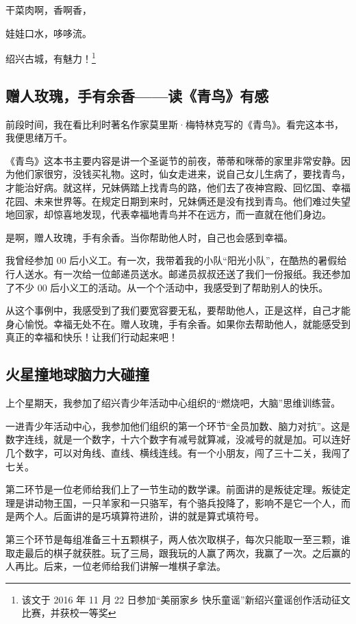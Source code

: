 \documentclass[UTF8,a4paper,titlepage,twoside,10.5pt]{article}
\begin{document}
干菜肉啊，香啊香，

娃娃口水，哆哆流。

绍兴古城，有魅力！\footnote{该文于 2016 年 11 月 22 日参加“美丽家乡  快乐童谣”新绍兴童谣创作活动征文比赛，并获校一等奖}

\subsection{赠人玫瑰，手有余香——读《青鸟》有感}
\label{sec:org54d6878}

前段时间，我在看比利时著名作家莫里斯·梅特林克写的《青鸟》。看完这本书，我便思绪万千。

《青鸟》这本书主要内容是讲一个圣诞节的前夜，蒂蒂和咪蒂的家里非常安静。因为他们家很穷，没钱买礼物。这时，仙女走进来，说自己女儿生病了，要找青鸟，才能治好病。就这样，兄妹俩踏上找青鸟的路，他们去了夜神宫殿、回忆国、幸福花园、未来世界等。在规定日期到来时，兄妹俩还是没有找到青鸟。他们难过失望地回家，却惊喜地发现，代表幸福地青鸟并不在远方，而一直就在他们身边。

是啊，赠人玫瑰，手有余香。当你帮助他人时，自己也会感到幸福。

我曾经参加 00 后小义工。有一次，我带着我的小队“阳光小队”，在酷热的暑假给行人送水。有一次给一位邮递员送水。邮递员叔叔还送了我们一份报纸。我还参加了不少 00 后小义工的活动。从一个个活动中，我感受到了帮助别人的快乐。

从这个事例中，我感受到了我们要宽容要无私，要帮助他人，正是这样，自己才能身心愉悦。幸福无处不在。赠人玫瑰，手有余香。如果你去帮助他人，就能感受到真正的幸福和快乐！让我们行动起来吧！

\subsection{火星撞地球脑力大碰撞}
\label{sec:org4ce64ae}

上个星期天，我参加了绍兴青少年活动中心组织的“燃烧吧，大脑”思维训练营。

一进青少年活动中心，我参加他们组织的第一个环节“全员加数、脑力对抗”。这是数字连线，就是一个数字，十六个数字有减号就算减，没减号的就是加。可以连好几个数字，可以对角线、直线、横线连线。有一个小朋友，闯了三十二关，我闯了七关。

第二环节是一位老师给我们上了一节生动的数学课。前面讲的是叛徒定理。叛徒定理是讲动物王国，一只羊家和一只骆军，有个骆兵投降了，影响不是它一个人，而是两个人。后面讲的是巧填算符进阶，讲的就是算式填符号。

第三个环节是每组准备三十五颗棋子，两人依次取棋子，每次只能取一至三颗，谁取走最后的棋子就获胜。玩了三局，跟我玩的人赢了两次，我赢了一次。之后赢的人再比。后来，一位老师给我们讲解一堆棋子拿法。
\end{document}

